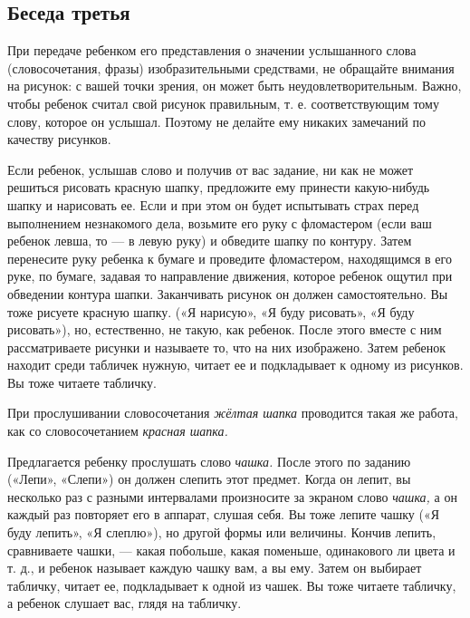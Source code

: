 \documentclass{book}
\renewcommand{\emph}[1]{\textit{#1}}
\begin{document}
\subsection*{Беседа третья}

При передаче ребенком его представления о значении услышанного слова
(словосочетания, фразы) изобразительными средствами, не обращайте
внимания на рисунок: с вашей точки зрения, он может быть
неудовлетворительным. Важно, чтобы ребенок считал свой рисунок
правильным, т. е. соответствующим тому слову, которое он услышал.
Поэтому не делайте ему никаких замечаний по качеству рисунков.

Если ребенок, услышав слово и получив от вас задание, ни как не может
решиться рисовать красную шапку, предложите ему принести какую-нибудь
шапку и нарисовать ее. Если и при этом он будет испытывать страх перед
выполнением незнакомого дела, возьмите его руку с фломастером (если ваш
ребенок левша, то --- в левую руку) и обведите шапку по контуру. Затем
перенесите руку ребенка к бумаге и проведите фломастером, находящимся в
его руке, по бумаге, задавая то направление движения, которое ребенок
ощутил при обведении контура шапки. Заканчивать рисунок он должен
самостоятельно. Вы тоже рисуете красную шапку. («Я нарисую», «Я буду
рисовать», «Я буду рисовать»), но, естественно, не такую, как ребенок.
После этого вместе с ним рассматриваете рисунки и называете то, что на
них изображено. Затем ребенок находит среди табличек нужную, читает ее и
подкладывает к одному из рисунков. Вы тоже читаете табличку.

При прослушивании словосочетания \emph{жёлтая шапка} проводится такая же
работа, как со словосочетанием \emph{красная шапка.}

Предлагается ребенку прослушать слово \emph{чашка.} После этого по
заданию («Лепи», «Слепи») он должен слепить этот предмет. Когда он
лепит, вы несколько раз с разными интервалами произносите за экраном
слово \emph{чашка,} а он каждый раз повторяет его в аппарат, слушая
себя. Вы тоже лепите чашку («Я буду лепить», «Я слеплю»), но другой
формы или величины. Кончив лепить, сравниваете чашки, --- какая
побольше, какая поменьше, одинакового ли цвета и т. д., и ребенок
называет каждую чашку вам, а вы ему. Затем он выбирает табличку, читает
ее, подкладывает к одной из чашек. Вы тоже читаете табличку, а ребенок
слушает вас, глядя на табличку.
\end{document}

